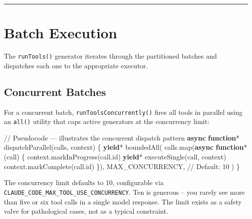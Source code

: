 \documentclass[
  english,
  11pt,
  letterpaper,
]{book}
\newenvironment{Shaded}{\begin{snugshade}}{\end{snugshade}}
\newcommand{\AttributeTok}[1]{\textcolor[rgb]{0.40,0.45,0.13}{#1}}
\newcommand{\CommentTok}[1]{\textcolor[rgb]{0.37,0.37,0.37}{#1}}
\newcommand{\FunctionTok}[1]{\textcolor[rgb]{0.28,0.35,0.67}{#1}}
\newcommand{\KeywordTok}[1]{\textcolor[rgb]{0.00,0.23,0.31}{\textbf{#1}}}
\newcommand{\NormalTok}[1]{\textcolor[rgb]{0.00,0.23,0.31}{#1}}
\newcommand{\OperatorTok}[1]{\textcolor[rgb]{0.37,0.37,0.37}{#1}}
\begin{document}
\begin{center}\rule{0.5\linewidth}{0.5pt}\end{center}

\section{Batch Execution}\label{batch-execution}

The \texttt{runTools()} generator iterates through the partitioned
batches and dispatches each one to the appropriate executor.

\subsection{Concurrent Batches}\label{concurrent-batches}

For a concurrent batch, \texttt{runToolsConcurrently()} fires all tools
in parallel using an \texttt{all()} utility that caps active generators
at the concurrency limit:

\begin{Shaded}
\begin{Highlighting}[]
\CommentTok{// Pseudocode — illustrates the concurrent dispatch pattern}
\KeywordTok{async} \KeywordTok{function}\OperatorTok{*} \FunctionTok{dispatchParallel}\NormalTok{(calls}\OperatorTok{,}\NormalTok{ context) \{}
  \KeywordTok{yield}\OperatorTok{*} \FunctionTok{boundedAll}\NormalTok{(}
\NormalTok{    calls}\OperatorTok{.}\FunctionTok{map}\NormalTok{(}\KeywordTok{async} \KeywordTok{function}\OperatorTok{*}\NormalTok{ (call) \{}
\NormalTok{      context}\OperatorTok{.}\FunctionTok{markInProgress}\NormalTok{(call}\OperatorTok{.}\AttributeTok{id}\NormalTok{)}
      \KeywordTok{yield}\OperatorTok{*} \FunctionTok{executeSingle}\NormalTok{(call}\OperatorTok{,}\NormalTok{ context)}
\NormalTok{      context}\OperatorTok{.}\FunctionTok{markComplete}\NormalTok{(call}\OperatorTok{.}\AttributeTok{id}\NormalTok{)}
\NormalTok{    \})}\OperatorTok{,}
\NormalTok{    MAX\_CONCURRENCY}\OperatorTok{,}  \CommentTok{// Default: 10}
\NormalTok{  )}
\NormalTok{\}}
\end{Highlighting}
\end{Shaded}

The concurrency limit defaults to 10, configurable via
\texttt{CLAUDE\_CODE\_MAX\_TOOL\_USE\_CONCURRENCY}. Ten is generous --
you rarely see more than five or six tool calls in a single model
response. The limit exists as a safety valve for pathological cases, not
as a typical constraint.
\end{document}
